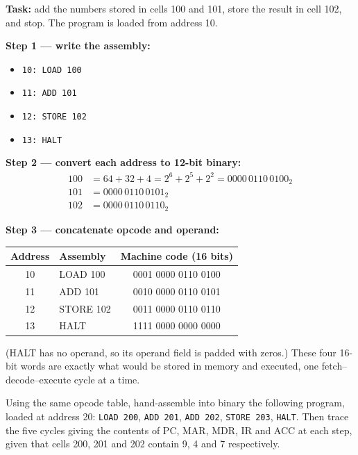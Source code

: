 \documentclass[11pt]{article}
\begin{document}
\textbf{Task:} add the numbers stored in cells 100 and 101, store the result in cell 102, and stop. The program is loaded from address 10.

\textbf{Step 1 — write the assembly:}
\begin{itemize}
\item[] \texttt{10: LOAD 100}
\item[] \texttt{11: ADD 101}
\item[] \texttt{12: STORE 102}
\item[] \texttt{13: HALT}
\end{itemize}

\textbf{Step 2 — convert each address to 12-bit binary:}
\begin{align*}
100 &= 64 + 32 + 4 = 2^6 + 2^5 + 2^2 = 0000\,0110\,0100_2\\
101 &= 0000\,0110\,0101_2\\
102 &= 0000\,0110\,0110_2
\end{align*}

\textbf{Step 3 — concatenate opcode and operand:}

\begin{center}
\begin{tabular}{|c|l|c|}
\hline
\rowcolor{popblueL} \textbf{Address} & \textbf{Assembly} & \textbf{Machine code (16 bits)} \\
\hline
10 & LOAD 100 & 0001 0000 0110 0100 \\
11 & ADD 101 & 0010 0000 0110 0101 \\
12 & STORE 102 & 0011 0000 0110 0110 \\
13 & HALT & 1111 0000 0000 0000 \\
\hline
\end{tabular}
\end{center}

(HALT has no operand, so its operand field is padded with zeros.) These four 16-bit words are exactly what would be stored in memory and executed, one fetch--decode--execute cycle at a time.

\begin{exercice}
Using the same opcode table, hand-assemble into binary the following program, loaded at address 20: \texttt{LOAD 200}, \texttt{ADD 201}, \texttt{ADD 202}, \texttt{STORE 203}, \texttt{HALT}. Then trace the five cycles giving the contents of PC, MAR, MDR, IR and ACC at each step, given that cells 200, 201 and 202 contain 9, 4 and 7 respectively.
\end{exercice}
\end{document}
